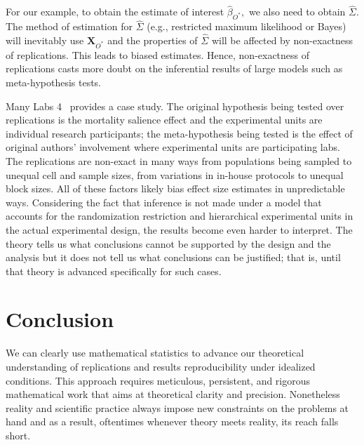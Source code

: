 \documentclass[meta,authordate]{jote-new-article}
\newcommand{\X}{\mathbf{X}}
\newcounter{result}
\begin{document}
For our example, to obtain the estimate of interest $\hat{\beta}_{O^*},$ we also need to obtain
$\widehat{\Sigma}.$ The method of estimation for $\widehat{\Sigma}$ (e.g., restricted maximum likelihood or Bayes) will inevitably use $\X_{O^*}$ and the properties of $\widehat{\Sigma}$ will be affected by non-exactness of replications. This leads to biased estimates. Hence, non-exactness of replications casts more doubt on the inferential results of large models such as meta-hypothesis tests.

Many Labs 4~\parencite{klein2022many} provides a case study. The original hypothesis being tested over replications is the mortality salience effect and the experimental units are individual research participants; the meta-hypothesis being tested is the effect of original authors' involvement where experimental units are participating labs. The replications are non-exact in many ways from populations being sampled to unequal cell and sample sizes, from variations in in-house protocols to unequal block sizes. All of these factors likely bias effect size estimates in unpredictable ways. Considering the fact that inference is not made under a model that accounts for the randomization restriction and hierarchical experimental units in the actual experimental design, the results become even harder to interpret. The theory tells us what conclusions cannot be supported by the design and the analysis but it does not tell us what conclusions can be justified; that is, until that theory is advanced specifically for such cases.

\section{Conclusion}

We can clearly use mathematical statistics to advance our theoretical understanding of replications and results reproducibility under idealized conditions. This approach requires meticulous, persistent, and rigorous mathematical work that aims at theoretical clarity and precision. Nonetheless reality and scientific practice always impose new constraints on the problems at hand and as a result, oftentimes whenever theory meets reality, its reach falls short.
\end{document}
